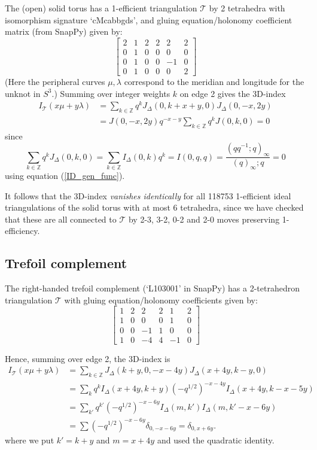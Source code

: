 \documentclass[12pt,reqno]{amsart}  %
\theoremstyle{definition}
\theoremstyle{remark}
\def\ID{I_{\Delta}}
\newcommand{\T}{\mathcal{T}}
\def\Z{\mathbb Z}
\def\JD{J_{\Delta}}
\begin{document}
The (open) solid torus has a 1-efficient triangulation $\T$  by 2 
tetrahedra with isomorphism signature `cMcabbgds', 
and gluing equation/holonomy coefficient matrix (from SnapPy) given by:
$$\begin{bmatrix} 2 & 1 & 2 & 2 & 2 & 2 \\ 0 & 1 & 0 & 0&0&0\\
0 & 1 & 0 & 0 & -1 & 0\\ 0 & 1 & 0 & 0 & 0& 2
\end{bmatrix}$$
(Here the peripheral curves $\mu,\lambda$ correspond to the meridian and 
longitude for the unknot in $S^3$.)
Summing over integer weights $k$ on edge 2 gives the 3D-index 
\begin{align*}
I_\T(x \mu + y \lambda) & =\sum_{k \in \Z} q^k \JD(0,k+x+y,0)\JD(0,-x,2y) \\
& =J(0,-x,2y) q^{-x-y} \sum_{k\in\Z} q^kJ(0,k,0)=0
\end{align*}
since
$$
\sum_{k\in\Z} q^k \JD(0,k,0) = 
\sum_{k\in\Z} \ID(0,k) q^k = I(0,q,q)= \frac{(q q^{-1};q)_\infty}{(q)_\infty;q}=0
$$
using equation (\ref{ID_gen_func}). 

It follows that the 3D-index {\em vanishes identically} for
all 118753 1-efficient ideal triangulations of the solid torus with 
at most 6 tetrahedra, since we have checked that these are all connected to 
$\T$ by 2-3, 3-2, 0-2 and 2-0 moves preserving 1-efficiency.

\subsection{Trefoil complement}
\label{trefoil_ex}

The right-handed trefoil complement (`L103001' in SnapPy) has a 
2-tetrahedron triangulation $\T$ with gluing equation/holonomy coefficients 
given by:
$$
\begin{bmatrix} 1 & 2 & 2 & 2 & 1 & 2 \\ 1 & 0 & 0 & 0&1&0\\
0 & 0 & -1 & 1 & 0 & 0\\ 1 & 0 & -4 & 4 & -1 & 0
\end{bmatrix}
$$

Hence, summing over edge 2, the 3D-index is
\begin{align*}
I_\T(x \mu + y \lambda) &= \sum_{k \in \Z} \JD(k+y,0,-x-4y)\JD(x+4y,k-y,0) \\
&=\sum_k q^k \ID(x+4y,k+y)(-q^{1/2})^{-x-4y}\ID(x+4y,k-x-5y) \\
&= \sum_{k'} q^{k'} (-q^{1/2})^{-x-6y} \ID(m,k') \ID(m,k'-x-6y) \\
&= \sum (-q^{1/2})^{-x-6y} \delta_{0,-x-6y} = \delta_{0,x+6y}.
\end{align*}
where we put $k'=k+y$ and $m=x+4y$ and used the quadratic identity.
\end{document}
